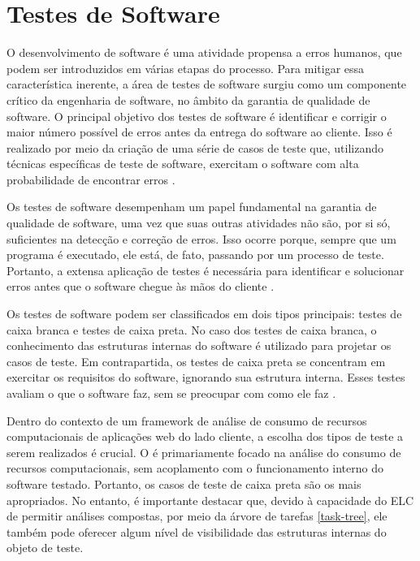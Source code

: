 \documentclass[12pt]{tcc}
\begin{document}
	\section{Testes de Software}
	\label{cap:software-testing}
	O desenvolvimento de software é uma atividade propensa a erros humanos, que podem ser introduzidos em várias etapas do processo.
	Para mitigar essa característica inerente, a área de testes de software surgiu como um componente crítico da engenharia de software, no âmbito da garantia de qualidade de software.
	O principal objetivo dos testes de software é identificar e corrigir o maior número possível de erros antes da entrega do software ao cliente.
	Isso é realizado por meio da criação de uma série de casos de teste que, utilizando técnicas específicas de teste de software, exercitam o software com alta probabilidade de encontrar erros \citep{pressman2009software}.

	Os testes de software desempenham um papel fundamental na garantia de qualidade de software, uma vez que suas outras atividades não são, por si só, suficientes na detecção e correção de erros.
	Isso ocorre porque, sempre que um programa é executado, ele está, de fato, passando por um processo de teste.
	Portanto, a extensa aplicação de testes é necessária para identificar e solucionar erros antes que o software chegue às mãos do cliente \citep{pressman2009software}.

	Os testes de software podem ser classificados em dois tipos principais: testes de caixa branca e testes de caixa preta.
	No caso dos testes de caixa branca, o conhecimento das estruturas internas do software é utilizado para projetar os casos de teste.
	Em contrapartida, os testes de caixa preta se concentram em exercitar os requisitos do software, ignorando sua estrutura interna. Esses testes avaliam o que o software faz, sem se preocupar com como ele faz \citep{pressman2009software}.

	Dentro do contexto de um framework de análise de consumo de recursos computacionais de aplicações web do lado cliente, a escolha dos tipos de teste a serem realizados é crucial.
	O  é primariamente focado na análise do consumo de recursos computacionais, sem acoplamento com o funcionamento interno do software testado.
	Portanto, os casos de teste de caixa preta são os mais apropriados.
	No entanto, é importante destacar que, devido à capacidade do ELC de permitir análises compostas, por meio da árvore de tarefas \ref{task-tree}, ele também pode oferecer algum nível de visibilidade das estruturas internas do objeto de teste.
\end{document}
